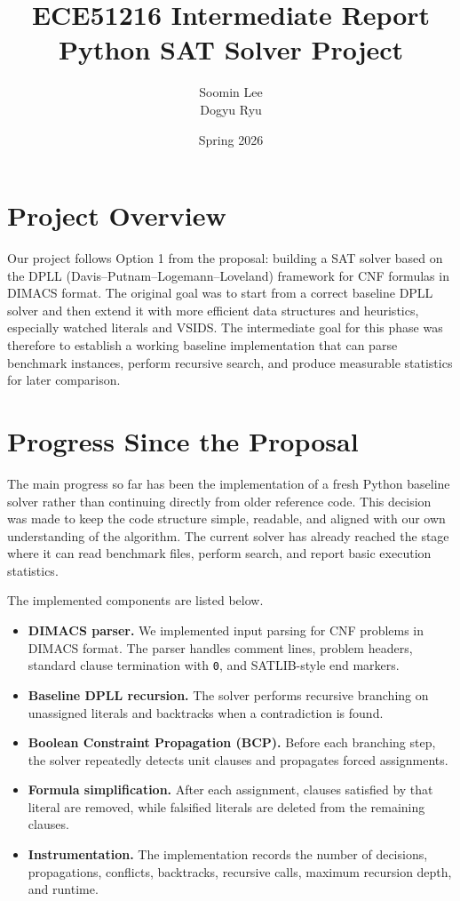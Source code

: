 \documentclass[11pt]{article}
\title{ECE51216 Intermediate Report\\Python SAT Solver Project}
\author{Soomin Lee \\ Dogyu Ryu}
\date{Spring 2026}
\begin{document}
\maketitle

\section{Project Overview}

Our project follows Option 1 from the proposal: building a SAT solver based on the DPLL
(Davis--Putnam--Logemann--Loveland) framework for CNF formulas in DIMACS format. The
original goal was to start from a correct baseline DPLL solver and then extend it with more
efficient data structures and heuristics, especially watched literals and VSIDS. The intermediate
goal for this phase was therefore to establish a working baseline implementation that can parse
benchmark instances, perform recursive search, and produce measurable statistics for later
comparison.

\section{Progress Since the Proposal}

The main progress so far has been the implementation of a fresh Python baseline solver rather than
continuing directly from older reference code. This decision was made to keep the code structure
simple, readable, and aligned with our own understanding of the algorithm. The current solver has
already reached the stage where it can read benchmark files, perform search, and report basic
execution statistics.

The implemented components are listed below.

\begin{itemize}
    \item \textbf{DIMACS parser.} We implemented input parsing for CNF problems in DIMACS
    format. The parser handles comment lines, problem headers, standard clause termination with
    \texttt{0}, and SATLIB-style end markers.
    \item \textbf{Baseline DPLL recursion.} The solver performs recursive branching on
    unassigned literals and backtracks when a contradiction is found.
    \item \textbf{Boolean Constraint Propagation (BCP).} Before each branching step, the solver
    repeatedly detects unit clauses and propagates forced assignments.
    \item \textbf{Formula simplification.} After each assignment, clauses satisfied by that literal
    are removed, while falsified literals are deleted from the remaining clauses.
    \item \textbf{Instrumentation.} The implementation records the number of decisions,
    propagations, conflicts, backtracks, recursive calls, maximum recursion depth, and runtime.
\end{itemize}
\end{document}

